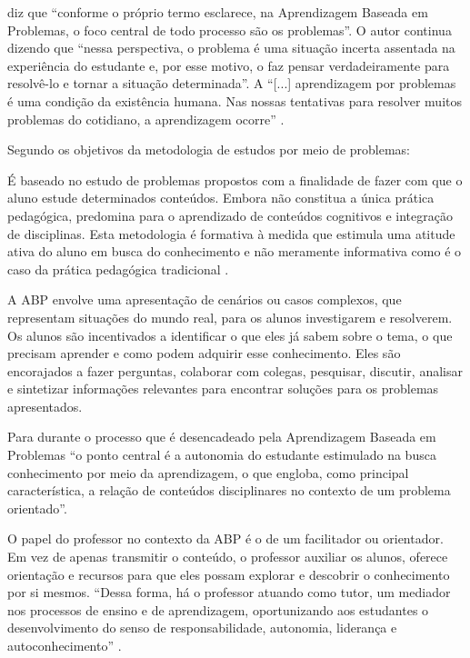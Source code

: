  diz que ``conforme o próprio termo esclarece, na Aprendizagem Baseada em Problemas, o foco central de todo processo são os problemas''. O autor continua dizendo que ``nessa perspectiva, o problema é uma situação incerta assentada na experiência do estudante e, por esse motivo, o faz pensar verdadeiramente para resolvê-lo e tornar a situação determinada''. A ``[...] aprendizagem por problemas é uma condição da existência humana. Nas nossas tentativas para resolver muitos problemas do cotidiano, a aprendizagem ocorre'' \cite[p. 55]{SOUZA2016}.

Segundo  os objetivos da metodologia de estudos por meio de problemas:

\begin{citacao}
    É baseado no estudo de problemas propostos com a finalidade de fazer com que o aluno estude determinados conteúdos. Embora não constitua a única prática pedagógica, predomina para o aprendizado de conteúdos cognitivos e integração de disciplinas. Esta metodologia é formativa à medida que estimula uma atitude ativa do aluno em busca do conhecimento e não meramente informativa como é o caso da prática pedagógica tradicional \cite[p. 50]{TANGERINO2017}.
\end{citacao}

A ABP envolve uma apresentação de cenários ou casos complexos, que representam situações do mundo real, para os alunos investigarem e resolverem. Os alunos são incentivados a identificar o que eles já sabem sobre o tema, o que precisam aprender e como podem adquirir esse conhecimento. Eles são encorajados a fazer perguntas, colaborar com colegas, pesquisar, discutir, analisar e sintetizar informações relevantes para encontrar soluções para os problemas apresentados.

Para  durante o processo que é desencadeado pela Aprendizagem Baseada em Problemas ``o ponto central é a autonomia do estudante estimulado na busca conhecimento por meio da aprendizagem, o que engloba, como principal característica, a relação de conteúdos disciplinares no contexto de um problema orientado''.

O papel do professor no contexto da ABP é o de um facilitador ou orientador. Em vez de apenas transmitir o conteúdo, o professor auxiliar os alunos, oferece orientação e recursos para que eles possam explorar e descobrir o conhecimento por si mesmos. ``Dessa forma, há o professor atuando como tutor, um mediador nos processos de ensino e de aprendizagem, oportunizando aos estudantes o desenvolvimento do senso de responsabilidade, autonomia, liderança e autoconhecimento'' \cite[p. 44]{NUNES2022}.

